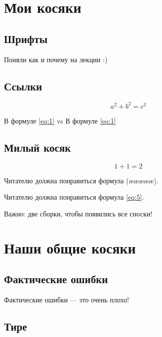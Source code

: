 \documentclass[12pt, a4paper]{article}
\begin{document}
 

\section{Мои косяки} 
\subsection{Шрифты}

Поняли как и почему на лекции :)

\subsection{Ссылки}

\begin{equation}
a^2+b^2=c^2\label{eq:1}
\end{equation}

В формуле \eqref{eq:1} vs В формуле  \ref{eq:1}

\subsection{Милый косяк}

\begin{equation} \label{eq:5} 
1 + 1 = 2
\tag{ææææ}
\end{equation}

Читателю должна понравиться формула (æææææ). 

Читателю должна понравиться формула \eqref{eq:5}. 

Важно: две сборки, чтобы появились все сноски! 

\section{Наши общие косяки} 

\subsection{Фактические ошибки}

Фактические ошибки --- это очень плохо! 


\subsection{Тире}

\end{document}
